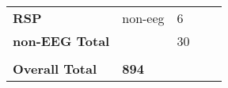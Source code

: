 \begin{table}[H]
\begin{tabular}{lllll}
\textbf{RSP}            & non-eeg       & 6                             &                           &              \\
\textbf{non-EEG Total}  &               & 30                            &                           &              \\
                        &               &                               &                           &              \\
\textbf{Overall Total}  & \textbf{894}  &                               &                           &             
\end{tabular}
\end{table}




